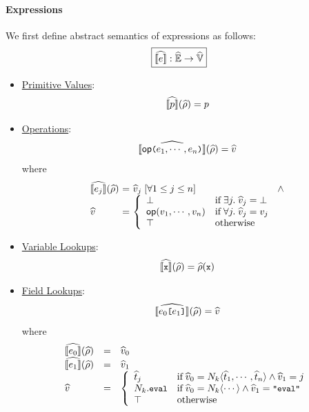 \paragraph{Expressions} We first define abstract semantics of expressions as
follows:
\[
  \framebox{$\asem{\expr}: \aenvset \rightarrow \avalset$}
\]
\begin{itemize}
  \item \underline{Primitive Values}:
    \[
      \widehat{\llbracket{p}\rrbracket}(\widehat{\rho}) = p
    \]
  \item \underline{Operations}:
    \[
      \widehat{\llbracket{\textsf{op}{\small \texttt{(}}e_1, \cdots, e_n {\small \texttt{)}}}\rrbracket}(\widehat{\rho}) = \widehat{v}
    \]
    where
    \[
      \begin{array}{l@{~}c@{~}l@{~}l}
        \asem{\expr_j}(\aenv) &=& \aval_j \; [\forall 1 \leq j \leq n]
        &\wedge\\
        \aval &=& \left\{
          \begin{array}{ll}
            \bot & \text{if} \; \exists j. \; \aval_j = \bot\\

            \op(\val_1, \cdots, \val_n) &
            \text{if} \; \forall j. \; \aval_j = \val_j\\

            \top & \text{otherwise}\\
          \end{array}
        \right.\\
      \end{array}
    \]
  \item \underline{Variable Lookups}:
    \[
      \widehat{\llbracket{{\small \texttt{x}}}\rrbracket}(\widehat{\rho}) = \widehat{\rho}({\small \texttt{x}})
    \]
  \item \underline{Field Lookups}:
    \[
      \widehat{\llbracket{e_0 {\small \texttt{[}}e_1 {\small \texttt{]}}}\rrbracket}(\widehat{\rho}) = \widehat{v}
    \]
    where
    \[
      \begin{array}{lcl}
        \widehat{\llbracket{e_0}\rrbracket}(\widehat{\rho}) &=& \widehat{v}_0\\
        \widehat{\llbracket{e_1}\rrbracket}(\widehat{\rho}) &=& \widehat{v}_1\\
        \widehat{v} &=& \left\{
          \begin{array}{ll}
            \widehat{t}_j & \text{if} \;
            \widehat{v}_0 = N_k \langle \widehat{t}_1, \cdots, \widehat{t}_n \rangle \wedge
            \widehat{v}_1 = j\\

            N_k.{\small \texttt{eval}} & \text{if} \;
            \widehat{v}_0 = N_k \langle \cdots \rangle \wedge
            \widehat{v}_1 = {\small \texttt{"eval"}}\\

            \top & \text{otherwise}\\
          \end{array}
        \right.\\
      \end{array}
    \]
\end{itemize}

